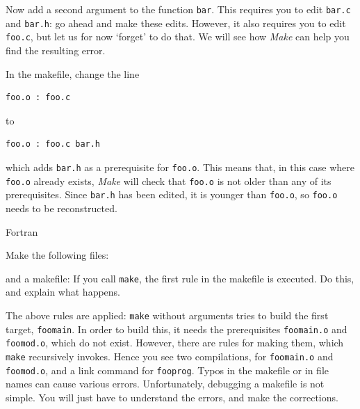Now add a second argument to the function \lstinline{bar}. This requires you
to edit \lstinline{bar.c} and \lstinline{bar.h}: go ahead and make these
edits. However, it also requires you to edit \lstinline{foo.c}, but let us for
now `forget' to do that. We will see how \emph{Make} can help you find
the resulting error.


In the makefile, change the line
\begin{lstlisting}
foo.o : foo.c
\end{lstlisting}
to
\begin{lstlisting}
foo.o : foo.c bar.h
\end{lstlisting}
which adds \lstinline{bar.h} as a prerequisite for \lstinline{foo.o}. This means that,
in this case where \lstinline{foo.o} already exists, \emph{Make} will check
that \lstinline{foo.o} is not older than any of its prerequisites. Since
\lstinline{bar.h} has been edited, it is younger than \lstinline{foo.o}, so \lstinline{foo.o}
needs to be reconstructed.


 {Fortran}

Make the following files:

and a makefile:
If you call \lstinline{make}, the first rule in the makefile is executed. Do
this, and explain what happens.

  {The above rules are applied: \lstinline{make} without arguments tries to
    build the first target, \lstinline{foomain}. In order to build this, it
    needs the prerequisites \lstinline{foomain.o} and \lstinline{foomod.o}, which do not
    exist. However, there are rules for making them, which \lstinline{make}
    recursively invokes. Hence you see two compilations, for \lstinline{foomain.o}
    and \lstinline{foomod.o}, and a link command for \lstinline{fooprog}.}
  {Typos in the makefile or in file names can cause various
    errors. Unfortunately, debugging a makefile is not simple. You
    will just have to understand the errors, and make the
    corrections.}


